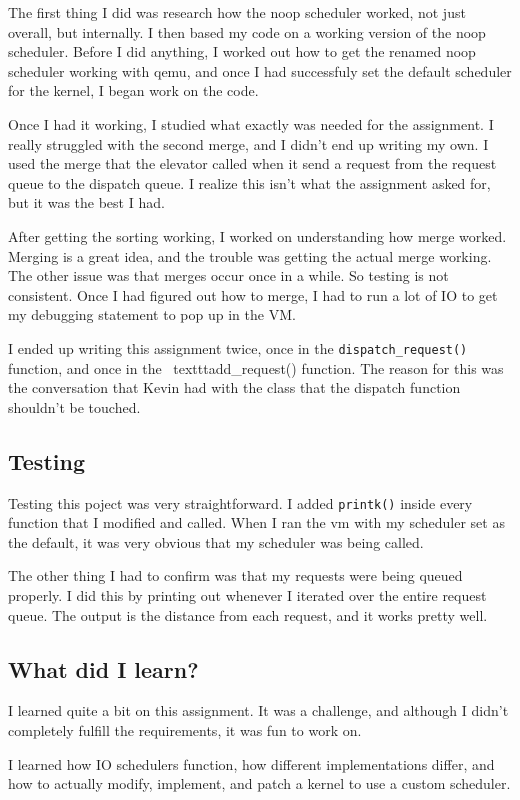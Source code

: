 \documentclass[10pt,letterpaper]{article}
\begin{document}
	The first thing I did was research how the noop scheduler worked, not just
	overall, but internally. I then based my code on a working version of the 
	noop scheduler. Before I did anything, I worked out how to get the renamed
	noop scheduler working with qemu, and once I had successfuly set the default
	scheduler for the kernel, I began work on the code.

	Once I had it working, I studied what exactly was needed for the assignment.
	I really struggled with the second merge, and I didn't end up writing my own.
	I used the merge that the elevator called when it send a request from the
	request queue to the dispatch queue. I realize this isn't what the assignment
	asked for, but it was the best I had.

	After getting the sorting working, I worked on understanding how merge worked.
	Merging is a great idea, and the trouble was getting the actual merge working.
	The other issue was that merges occur once in a while. So testing is not
	consistent. Once I had figured out how to merge, I had to run a lot of IO
	to get my debugging statement to pop up in the VM.

	I ended up writing this assignment twice, once in the 
	\texttt{dispatch\_request()} function, and once in the \
	texttt{add\_request()} function. The reason for this was the conversation
	that Kevin had with the class that the dispatch function shouldn't be touched.

	\subsection{Testing}
	Testing this poject was very straightforward. I added \texttt{printk()} inside
	every function that I modified and called. When I ran the vm with my scheduler
	set as the default, it was very obvious that my scheduler was being called.

	The other thing I had to confirm was that my requests were being queued properly.
	I did this by printing out whenever I iterated over the entire request queue.
	The output is the distance from each request, and it works pretty well.

	\subsection{What did I learn?}
	I learned quite a bit on this assignment. It was a challenge, and although
	I didn't completely fulfill the requirements, it was fun to work on.

	I learned how IO schedulers function, how different implementations differ,
	and how to actually modify, implement, and patch a kernel to use a custom
	scheduler.
\end{document}
